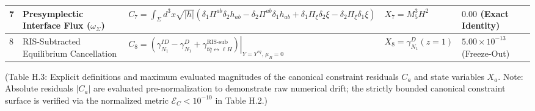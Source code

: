 \documentclass[aps,prd,onecolumn,superscriptaddress,nofootinbib,longbibliography,10pt]{revtex4-2}
\begin{document}
\begin{center}
\begin{tabular}{|lllll|}
      7 & Presymplectic Interface Flux (\(\omega_\Sigma\)) & \(C_7 = \int_\Sigma d^3x\sqrt{|h|}(\delta_1\Pi^{ab}\delta_2 h_{ab} - \delta_2\Pi^{ab}\delta_1 h_{ab} + \delta_1\Pi_\xi\delta_2\xi - \delta_2\Pi_\xi\delta_1\xi)\) & \(X_7 = M_5^3 H^2\) & \(0.00\) (Exact Identity) \\ \hline

      8 & RIS-Subtracted Equilibrium Cancellation & \(C_8 = \left.\left(\gamma_{N_1}^{ID} - \gamma_{N_1}^D + \gamma_{t\bar{q}\leftrightarrow\ell H}^{\text{RIS-sub}}\right)\right|_{Y=Y^{eq},\,\mu_B=0}\) & \(X_8 = \gamma_{N_1}^D(z=1)\) & \(5.00 \times 10^{-13}\) (Freeze-Out) \\ \hline

    
  \end{tabular}
\end{center}

  (Table H.3: Explicit definitions and maximum evaluated magnitudes of the canonical constraint residuals \(C_a\) and state variables \(X_a\). Note: Absolute residuals \(|C_a|\) are evaluated pre-normalization to demonstrate raw numerical drift; the strictly bounded canonical constraint surface is verified via the normalized metric \(\mathcal{E}_C < 10^{-10}\) in Table H.2.)










\end{document}
